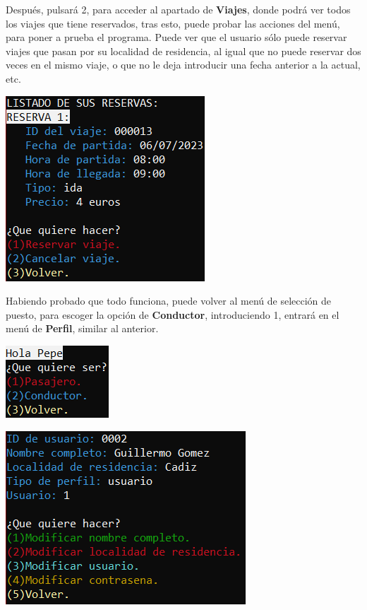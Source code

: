 Después, pulsará 2, para acceder al apartado de \textbf{Viajes}, donde podrá ver todos los viajes que tiene reservados, tras esto, puede probar las acciones del menú,
para poner a prueba el programa. Puede ver que el usuario sólo puede reservar viajes que pasan por su localidad de residencia, al igual que
no puede reservar dos veces en el mismo viaje, o que no le deja introducir una fecha anterior a la actual, etc.
\begin{center}
\includegraphics[]{FOTOS/menuPasajeroViaje.png}
\end{center}

Habiendo probado que todo funciona, puede volver al menú de selección de puesto, para escoger la opción de \textbf{Conductor}, introduciendo 1, entrará en el menú de \textbf{Perfil}, similar al anterior. 
\begin{center}
    \begin{center}
      \includegraphics[]{FOTOS/menuSeleccionUsuario.png}
    \end{center}
    \begin{center}
      \includegraphics[]{FOTOS/menuPasajeroPerfil.png}
    \end{center}
\end{center}

